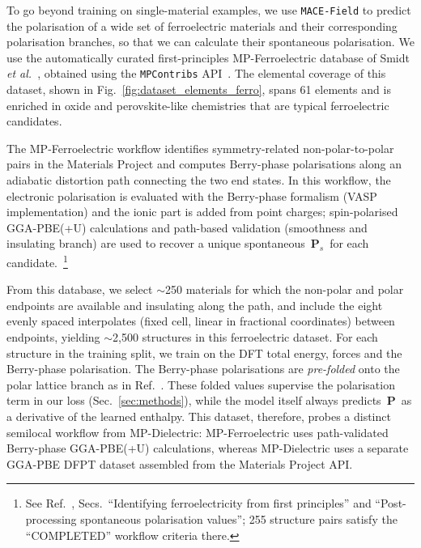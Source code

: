 \documentclass[aps,physrev,graphicx,amsmath,amssymb,
               reprint,superscriptaddress]{revtex4-2}
\begin{document}
To go beyond training on single-material examples, we use \texttt{MACE-Field} to predict the polarisation of a wide set of ferroelectric materials and their corresponding polarisation branches, so that we can calculate their spontaneous polarisation. We use the automatically curated first-principles MP-Ferroelectric database of Smidt \emph{et al.}~\cite{smidt-2020-ferrodb}, obtained using the \texttt{MPContribs} API~\cite{Horton2025NatMaterMP, jain-2013-mp, Huck2015eScience, Huck2016CCPE_MPContribs, AndreoniYip2020HMM}. The elemental coverage of this dataset, shown in Fig.~\ref{fig:dataset_elements_ferro}, spans 61 elements and is enriched in oxide and perovskite-like chemistries that are typical ferroelectric candidates.

The MP-Ferroelectric workflow identifies symmetry-related non-polar-to-polar pairs in the Materials Project and computes Berry-phase polarisations along an adiabatic distortion path connecting the two end states. In this workflow, the electronic polarisation is evaluated with the Berry-phase formalism (VASP implementation) and the ionic part is added from point charges; spin-polarised GGA-PBE(+U) calculations and path-based validation (smoothness and insulating branch) are used to recover a unique spontaneous $\,\mathbf P_s\,$ for each candidate.~\footnote{See Ref.~, Secs.\ ``Identifying ferroelectricity from first principles'' and ``Post-processing spontaneous polarisation values''; 255 structure pairs satisfy the ``COMPLETED'' workflow criteria there.}

From this database, we select $\sim$250 materials for which the non-polar and polar endpoints are available and insulating along the path, and include the eight evenly spaced interpolates (fixed cell, linear in fractional coordinates) between endpoints, yielding $\sim$2{,}500 structures in this ferroelectric dataset. For each structure in the training split, we train on the DFT total energy, forces and the Berry-phase polarisation. The Berry-phase polarisations are \emph{pre-folded} onto the polar lattice branch as in Ref.~. These folded values supervise the polarisation term in our loss (Sec.~\ref{sec:methods}), while the model itself always predicts $\,\mathbf P\,$ as a derivative of the learned enthalpy. This dataset, therefore, probes a distinct semilocal workflow from MP-Dielectric: MP-Ferroelectric uses path-validated Berry-phase GGA-PBE(+U) calculations, whereas MP-Dielectric uses a separate GGA-PBE DFPT dataset assembled from the Materials Project API. 
\\
\end{document}
